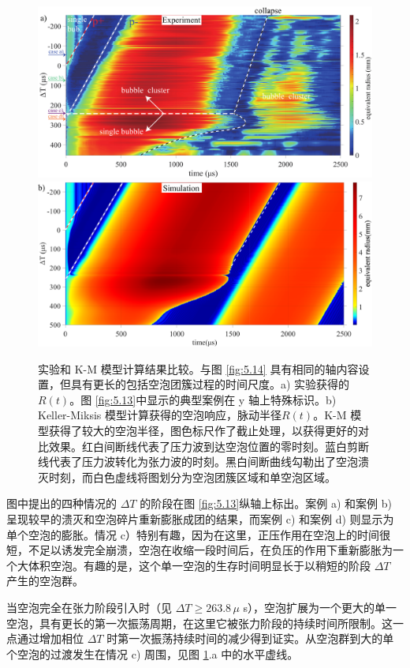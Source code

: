 \begin{figure}[H]
  \centering
  \includegraphics[width=1\linewidth]{img/fig5.15a.pdf}
  \includegraphics[width=1\linewidth]{img/fig5.15b.pdf}
  \caption[实验和 K-M
模型计算结果比较。]{实验和 K-M
模型计算结果比较。与图 \ref{fig:5.14}
具有相同的轴内容设置，但具有更长的包括空泡团簇过程的时间尺度。a)
实验获得的$R (t)$。图 \ref{fig:5.13}中显示的典型案例在 y 轴上特殊标识。b)
Keller-Miksis 模型计算获得的空泡响应，脉动半径$R (t)$。K-M
模型获得了较大的空泡半径，图色标尺作了截止处理，以获得更好的对比效果。红白间断线代表了压力波到达空泡位置的零时刻。蓝白剪断线代表了压力波转化为张力波的时刻。黑白间断曲线勾勒出了空泡溃灭时刻，而白色虚线将图划分为空泡团簇区域和单空泡区域。}
  \label{fig:5.15}
\end{figure}

图中提出的四种情况的 $\Delta T$ 的阶段在图 \ref{fig:5.13}纵轴上标出。案例 a)
和案例 b) 呈现较早的溃灭和空泡碎片重新膨胀成团的结果，而案例 c) 和案例
d) 则显示为单个空泡的膨胀。情况
c）特别有趣，因为在这里，正压作用在空泡上的时间很短，不足以诱发完全崩溃，空泡在收缩一段时间后，在负压的作用下重新膨胀为一个大体积空泡。有趣的是，这个单一空泡的生存时间明显长于以稍短的阶段
$\Delta T$ 产生的空泡群。

当空泡完全在张力阶段引入时（见 $\Delta T\geq 263.8\,\mu$
s），空泡扩展为一个更大的单一空泡，具有更长的第一次振荡周期，在这里它被张力阶段的持续时间所限制。这一点通过增加相位
$\Delta T$
时第一次振荡持续时间的减少得到证实。从空泡群到大的单个空泡的过渡发生在情况
c) 周围，见图 \ref{fig:5.15}.a 中的水平虚线。

